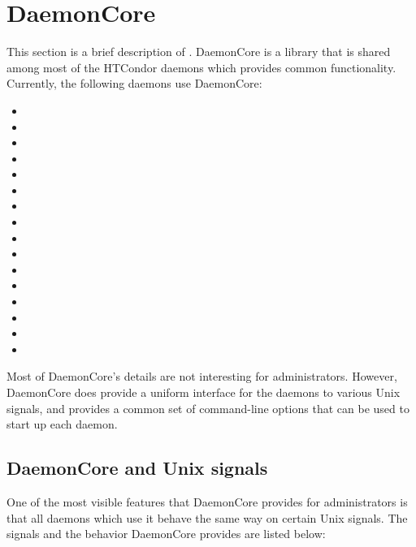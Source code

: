 
\section{\label{sec:DaemonCore}DaemonCore}

This section is a brief description of .  DaemonCore
is a library that is shared among most of the HTCondor daemons which
provides common functionality.  Currently, the following daemons use
DaemonCore:

\begin{itemize}
\item {}
\item {}
\item {}
\item {}
\item {}
\item {}
\item {}
\item {}
\item {}
\item {}
\item {}
\item {}
\item {}
\item {}
\item {}
\item {}
\end{itemize}

Most of DaemonCore's details are not interesting for administrators.
However, DaemonCore does provide a uniform interface for the daemons
to various Unix signals, and provides a common set of command-line
options that can be used to start up each daemon.

\subsection{\label{sec:DaemonCore-Signals}DaemonCore and Unix signals}

One of the most visible features that DaemonCore provides for
administrators is that all daemons which use it behave the same way on
certain Unix signals.  The signals and the behavior DaemonCore
provides are listed below:

